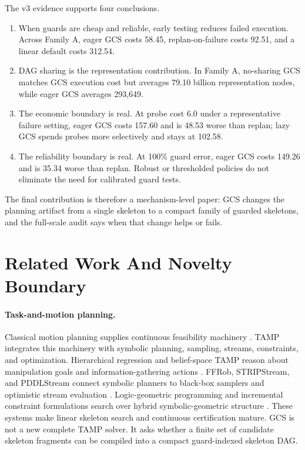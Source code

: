\documentclass{article}
\begin{document}
The v3 evidence supports four conclusions.
\begin{enumerate}
\item When guards are cheap and reliable, early testing reduces failed execution. Across Family A, eager GCS costs 58.45, replan-on-failure costs 92.51, and a linear default costs 312.54.
\item DAG sharing is the representation contribution. In Family A, no-sharing GCS matches GCS execution cost but averages 79.10 billion representation nodes, while eager GCS averages 293,649.
\item The economic boundary is real. At probe cost 6.0 under a representative failure setting, eager GCS costs 157.60 and is 48.53 worse than replan; lazy GCS spends probes more selectively and stays at 102.58.
\item The reliability boundary is real. At 100\% guard error, eager GCS costs 149.26 and is 35.34 worse than replan. Robust or thresholded policies do not eliminate the need for calibrated guard tests.
\end{enumerate}

The final contribution is therefore a mechanism-level paper: GCS changes the planning artifact from a single skeleton to a compact family of guarded skeletons, and the full-scale audit says when that change helps or fails.

\section{Related Work And Novelty Boundary}
\paragraph{Task-and-motion planning.}
Classical motion planning supplies continuous feasibility machinery \citep{kavraki1996probabilistic,lavalle2006planning,karaman2011sampling}. TAMP integrates this machinery with symbolic planning, sampling, streams, constraints, and optimization. Hierarchical regression and belief-space TAMP reason about manipulation goals and information-gathering actions \citep{kaelbling2011hierarchical,kaelbling2013belief}. FFRob, STRIPStream, and PDDLStream connect symbolic planners to black-box samplers and optimistic stream evaluation \citep{garrett2018ffrob,garrett2017stripstream,garrett2020pddlstream}. Logic-geometric programming and incremental constraint formulations search over hybrid symbolic-geometric structure \citep{toussaint2015logic,dantam2018incremental}. These systems make linear skeleton search and continuous certification mature. GCS is not a new complete TAMP solver. It asks whether a finite set of candidate skeleton fragments can be compiled into a compact guard-indexed skeleton DAG.
\end{document}
